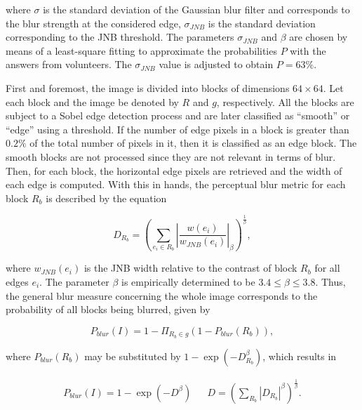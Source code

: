 \noindent where $\sigma$ is the standard deviation of the Gaussian blur filter and corresponds to the blur strength at the considered edge, $\sigma_{JNB}$ is the standard deviation corresponding to the JNB threshold. The parameters $\sigma_{JNB}$ and $\beta$ are chosen by means of a least-square fitting to approximate the probabilities $P$ with the answers from volunteers. The $\sigma_{JNB}$ value is adjusted to obtain $P = 63\%$.

First and foremost, the image is divided into blocks of dimensions $64 \times 64$. Let each block and the image be denoted by $R$ and $g$, respectively. All the blocks are subject to a Sobel edge detection process and are later classified as ``smooth'' or ``edge'' using a threshold. If the number of edge pixels in a block is greater than $0.2\%$ of the total number of pixels in it, then it is classified as an edge block. The smooth blocks are not processed since they are not relevant in terms of blur. Then, for each block, the horizontal edge pixels are retrieved and the width of each edge is computed. With this in hands, the perceptual blur metric for each block $R_{b}$ is described by the equation 

\begin{equation}
\label{eqn:perceptual_blur_metric}
D_{R_{b}} = \left(
\sum_{e_{i} \in R_{b}}
\left|
\frac{w(e_{i})}{w_{JNB}(e_{i})}
\right|_{\beta}
\right)^{\frac{1}{\beta}},
\end{equation}

\noindent where $w_{JNB}(e_{i})$ is the JNB width relative to the contrast of block $R_{b}$ for all edges $e_{i}$. The parameter $\beta$ is empirically determined to be $3.4 \leq \beta \leq 3.8$. Thus, the general blur measure concerning the whole image corresponds to the probability of all blocks being blurred, given by

\begin{equation}
\label{eqn:p_blur}
    P_{blur}(I) = 1 - \Pi_{R_{b} \in g}
    \left(
    1 - P_{blur}(R_{b})
    \right),
\end{equation}

\noindent where $P_{blur}(R_{b})$ may be substituted by $1 - \exp{\left(-D_{R_{b}}^{\beta} \right)}$, which results in

\begin{align}
\label{eqn:p_blur_final}
    P_{blur}(I) = 1 - \exp{\left(-D^{\beta}\right)}
&&
D = \left(
    \sum_{R_{b}}
    \left|D_{R_{b}}
    \right|^{\beta}
    \right)^{\frac{1}{\beta}}.
\end{align}

